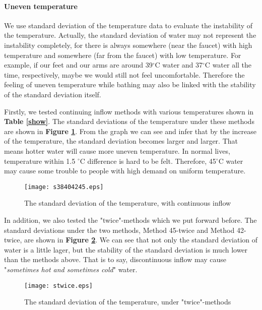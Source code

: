 \documentclass[12pt]{article}
\begin{document}
\paragraph{Uneven temperature}
We use standard deviation of the temperature data to evaluate the instability of the temperature.
Actually, the standard deviation of water may not represent the instability completely, for there is
always somewhere (near the faucet) with high temperature and somewhere (far from the faucet) with
low temperature. For example, if our feet and our arms are around 39$^\circ$C water and 37$^\circ$C
water all the time, respectively, maybe we would still not feel uncomfortable. Therefore the feeling
of uneven temperature while bathing may also be linked with the stability of the standard deviation
itself.

Firstly, we tested continuing inflow methods with various temperatures shown in \textbf{Table
\ref{show}}. The standard deviations of the temperature under these methods are shown in
\textbf{Figure \ref{s1}}. From the graph we can see and infer that by the increase of the
temperature, the standard deviation becomes larger and larger. That means hotter water will cause
more uneven temperature. In normal lives, temperature within 1.5 $^\circ$C difference is hard to be
felt. Therefore, 45$^\circ$C water may cause some trouble to people with high demand on uniform
temperature.
\begin{figure}[!htbp]
    \small
    \centering
    \texttt{[image: s38404245.eps]}
    \caption{The standard deviation of the temperature, with continuous inflow}\label{s1}
\end{figure}

In addition, we also tested the "twice"-methods which we put forward before. The standard deviations
under the two methods, Method 45-twice and Method 42-twice, are shown in \textbf{Figure \ref{s2}}.
We can see that not only the standard deviation of water is a little lager, but the stability of the
standard deviation is much lower than the methods above. That is to say, discontinuous inflow may
cause "\emph{sometimes hot and sometimes cold}" water.
\begin{figure}[!htbp]
    \small
    \centering
    \texttt{[image: stwice.eps]}
    \caption{The standard deviation of the temperature, under "twice"-methods}\label{s2}
\end{figure}
\end{document}
